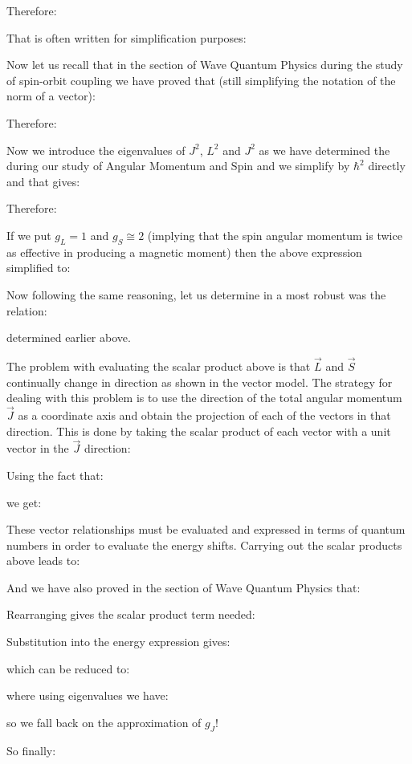 	Therefore:
	
	That is often written for simplification purposes:
	
	Now let us recall that in the section of Wave Quantum Physics during the study of spin-orbit coupling we have proved that (still simplifying the notation of the norm of a vector):
	
	Therefore:
	
	Now we introduce the eigenvalues of $J^2$, $L^2$ and $J^2$ as we have determined the during our study of Angular Momentum and Spin and we simplify by $\hbar^2$ directly and that gives:
	
	Therefore:
	
	If we put $g_L=1$ and $g_S\cong 2$ (implying that the spin angular momentum is twice as effective in producing a magnetic moment) then the above expression simplified to:
	
	Now following the same reasoning, let us determine in a most robust was the relation:
	
	determined earlier above.
	
	The problem with evaluating the scalar product above is that $\vec{L}$ and $\vec{S}$ continually change in direction as shown in the vector model. The strategy for dealing with this problem is to use the direction of the total angular momentum $\vec{J}$ as a coordinate axis and obtain the projection of each of the vectors in that direction. This is done by taking the scalar product of each vector with a unit vector in the $\vec{J}$ direction:
	
	Using the fact that:
	
	we get:
	
	These vector relationships must be evaluated and expressed in terms of quantum numbers in order to evaluate the energy shifts. Carrying out the scalar products above leads to:
	
	And we have also proved in the section of Wave Quantum Physics that:
	
	Rearranging gives the scalar product term needed:
	
	Substitution into the energy expression gives:
	
	which can be reduced to:
	
	where using eigenvalues we have:
	
	so we fall back on the approximation of $g_J$!
	
	So finally:
	
